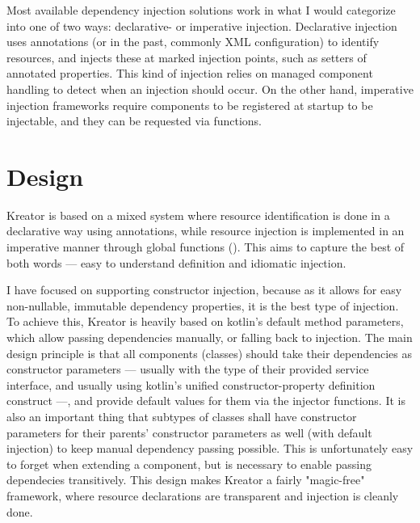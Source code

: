 		Most available dependency injection solutions work in what I would categorize into one of two ways: declarative- or imperative injection. Declarative injection uses annotations (or in the past, commonly XML configuration) to identify resources, and injects these at marked injection points, such as setters of annotated properties. This kind of injection relies on managed component handling to detect when an injection should occur. On the other hand, imperative injection frameworks require components to be registered at startup to be injectable, and they can be requested via functions.
	
	\section{Design}
	
		Kreator is based on a mixed system where resource identification is done in a declarative way using annotations, while resource injection is implemented in an imperative manner through global functions (). This aims to capture the best of both words --- easy to understand definition and idiomatic injection.
		
		I have focused on supporting constructor injection, because as it allows for easy non-nullable, immutable dependency properties, it is the best type of injection. To achieve this, Kreator is heavily based on kotlin's default method parameters, which allow passing dependencies manually, or falling back to injection. The main design principle is that all components (classes) should take their dependencies as constructor parameters --- usually with the type of their provided service interface, and usually using kotlin's unified constructor-property definition construct ---, and provide default values for them via the injector functions. It is also an important thing that subtypes of classes shall have constructor parameters for their parents' constructor parameters as well (with default injection) to keep manual dependency passing possible. This is unfortunately easy to forget when extending a component, but is necessary to enable passing dependecies transitively. This design makes Kreator a fairly "magic-free" framework, where resource declarations are transparent and injection is cleanly done.
		
